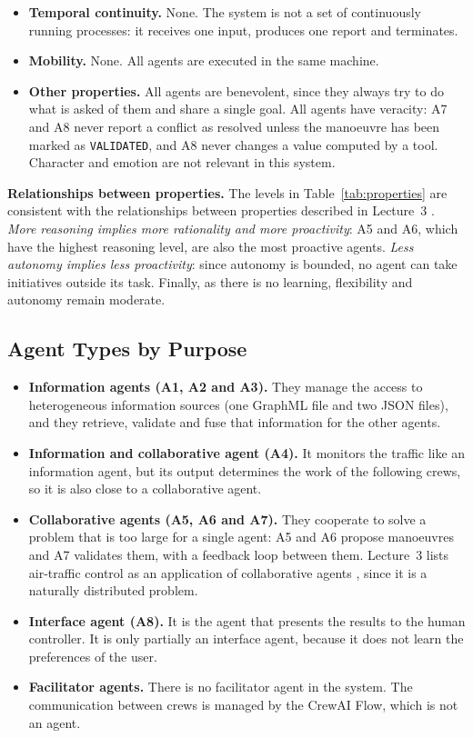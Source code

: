 \begin{itemize}[leftmargin=*]
    \item \textbf{Temporal continuity.} None. The system is not a set of continuously running processes: it receives one input, produces one report and terminates.
    \item \textbf{Mobility.} None. All agents are executed in the same machine.
    \item \textbf{Other properties.} All agents are benevolent, since they always try to do what is asked of them and share a single goal. All agents have veracity: A7 and A8 never report a conflict as resolved unless the manoeuvre has been marked as \texttt{VALIDATED}, and A8 never changes a value computed by a tool. Character and emotion are not relevant in this system.
\end{itemize}

\textbf{Relationships between properties.} The levels in Table~\ref{tab:properties} are consistent with the relationships between properties described in Lecture~3 \cite{urvlect3}. \emph{More reasoning implies more rationality and more proactivity}: A5 and A6, which have the highest reasoning level, are also the most proactive agents. \emph{Less autonomy implies less proactivity}: since autonomy is bounded, no agent can take initiatives outside its task. Finally, as there is no learning, flexibility and autonomy remain moderate.

\subsection{Agent Types by Purpose}\label{sec:types}

\begin{itemize}[leftmargin=*]
    \item \textbf{Information agents (A1, A2 and A3).} They manage the access to heterogeneous information sources (one GraphML file and two JSON files), and they retrieve, validate and fuse that information for the other agents.
    \item \textbf{Information and collaborative agent (A4).} It monitors the traffic like an information agent, but its output determines the work of the following crews, so it is also close to a collaborative agent.
    \item \textbf{Collaborative agents (A5, A6 and A7).} They cooperate to solve a problem that is too large for a single agent: A5 and A6 propose manoeuvres and A7 validates them, with a feedback loop between them. Lecture~3 lists air-traffic control as an application of collaborative agents \cite{urvlect3}, since it is a naturally distributed problem.
    \item \textbf{Interface agent (A8).} It is the agent that presents the results to the human controller. It is only partially an interface agent, because it does not learn the preferences of the user.
    \item \textbf{Facilitator agents.} There is no facilitator agent in the system. The communication between crews is managed by the CrewAI Flow, which is not an agent.
\end{itemize}

